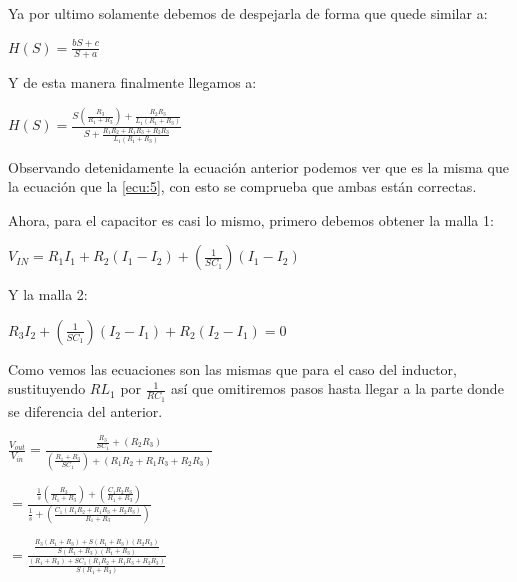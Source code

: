 \documentclass[letterpaper,spanish,12pt]{report}
\begin{document}
Ya por ultimo solamente debemos de despejarla de forma que quede similar a:

\begin{center}$H(S) = \frac{bS + c}{S + a}$\end{center}

Y de esta manera finalmente llegamos a:

\begin{center}$H(S) = \frac{S(\frac{R_{3}}{R_{1}+R_{3}}) + \frac{R_{2}R_{3}}{L_{1}(R_{1}+R_{3})}}{S + \frac{R_{1}R_{2}+R_{1}R_{3}+R_{2}R_{3}}{L_{1}(R_{1}+R_{3})}}$\end{center}

Observando detenidamente la ecuaci\'on anterior podemos ver que es la misma que la ecuaci\'on que la \ref{ecu:5}, con esto se comprueba que ambas están correctas.

Ahora, para el capacitor es casi lo mismo, primero debemos obtener la malla 1:

	\begin{center}$V_{IN} = R_{1}I_{1}+R_{2}(I_{1}-I_{2})+(\frac{1}{SC_{1}})(I_{1}-I_{2})$\end{center}

Y la malla 2:

	\begin{center}$R_{3}I_{2}+(\frac{1}{SC_{1}})(I_{2}-I_{1})+R_{2}(I_{2}-I_{1}) = 0$ \end{center}

Como vemos las ecuaciones son las mismas que para el caso del inductor, sustituyendo $RL_{1}$ por $\frac{1}{RC_{1}}$ as\'i que omitiremos pasos hasta llegar a la parte donde se diferencia del anterior.

	\begin{center}$\frac{V_{out}}{V_{in}} = \frac{\frac{R_{3}}{SC_{1}} + (R_{2}R_{3})}{(\frac{R_{1}+R_{3}}{SC_{1}}) + (R_{1}R_{2}+R_{1}R_{3}+R_{2}R_{3})}$\end{center}

	\begin{center}$= \frac{\frac{1}{s}(\frac{R_{3}}{R_{1}+R_{3}}) + (\frac{C_{1}R_{2}R_{3}}{R_{1}+R_{3}})}{\frac{1}{s} + (\frac{C_{1}(R_{1}R_{2}+R_{1}R_{3}+R_{2}R_{3})}{R_{1}+R_{3}})}$\end{center}

	\begin{center}$= \frac{\frac{R_{3}(R_{1}+R_{3})+S(R_{1}+R_{3})(R_{2}R_{3})}{S(R_{1}+R_{3})(R_{1}+R_{3})}}{\frac{(R_{1}+R_{3})+SC_{1}(R_{1}R_{2}+R_{1}R_{3}+R_{2}R_{3})}{S(R_{1}+R_{3})}}$\end{center}
	
\end{document}
